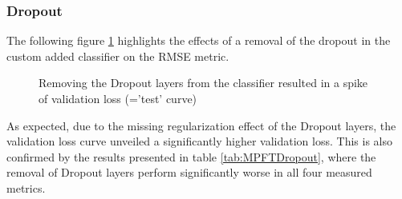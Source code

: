 \subsubsection{Dropout}
The following figure \ref{fig:AblationNoDropout} highlights the effects of a removal of the dropout in the custom added classifier on the RMSE metric.

\begin{figure}[H]
  \centering
  \hfill
  \caption{Removing the Dropout layers from the classifier resulted in a spike of validation loss (='test' curve)}
  \label{fig:AblationNoDropout}
\end{figure}

As expected, due to the missing regularization effect of the Dropout layers, the validation loss curve unveiled a significantly higher validation loss. This is also confirmed by the results presented in table \ref{tab:MPFTDropout}, where the removal of Dropout layers perform significantly worse in all four measured metrics.


